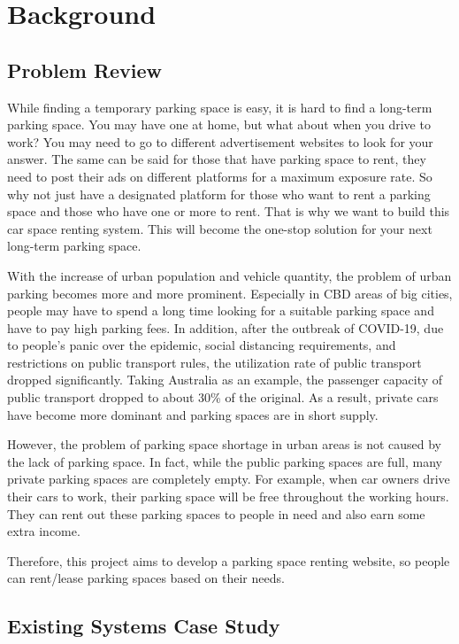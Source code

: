 \documentclass[12pt]{article}
\begin{document}

\tableofcontents
\section{Background}
  \subsection{Problem Review}

  While finding a temporary parking space is easy, it is hard to find a long-term parking space. You may have one at home, but what about when you drive to work? You may need to go to different advertisement websites to look for your answer. The same can be said for those that have parking space to rent, they need to post their ads on different platforms for a maximum exposure rate. So why not just have a designated platform for those who want to rent a parking space and those who have one or more to rent. That is why we want to build this car space renting system. This will become the one-stop solution for your next long-term parking space.

  With the increase of urban population and vehicle quantity, the problem of urban parking becomes more and more prominent. Especially in CBD areas of big cities, people may have to spend a long time looking for a suitable parking space and have to pay high parking fees. In addition, after the outbreak of COVID-19, due to people's panic over the epidemic, social distancing requirements, and restrictions on public transport rules, the utilization rate of public transport dropped significantly. Taking Australia as an example, the passenger capacity of public transport dropped to about 30\% of the original\cite{covid-travel}. As a result, private cars have become more dominant and parking spaces are in short supply.
  
  However, the problem of parking space shortage in urban areas is not caused by the lack of parking space. In fact, while the public parking spaces are full, many private parking spaces are completely empty. For example, when car owners drive their cars to work, their parking space will be free throughout the working hours. They can rent out these parking spaces to people in need and also earn some extra income.
  
  Therefore, this project aims to develop a parking space renting website, so people can rent/lease parking spaces based on their needs.
  
  \subsection{Existing Systems Case Study}
\end{document}
